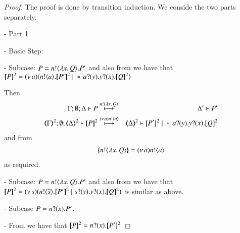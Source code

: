 \begin{proof}
	\noi The proof is done by transition induction.
	We conside the two parts separately.

	\noi - Part 1

	\noi - Basic Step:
 
	\noi - Subcase: $P= n ! \langle \lambda x.\,Q \rangle . P'$ 
	and also from 
	we have that\\
	$\pmap{P}{2} = \newsp{a}{\bout{n}{a} \pmap{P'}{2} \Par \repl{} \binp{a}{y} \binp{y}{x} \pmap{Q}{2}}$

	\noi Then
%
	\begin{eqnarray*}
		\Gamma; \es; \Delta \proves P &\hby{\bactout{n}{\abs{x}{Q}}} & \Delta' \proves P'\\
		\tmap{\Gamma}{2}; \es; \tmap{\Delta}{2} \proves \pmap{P}{2} &\hby{\news{a} \bactout{n}{a}}& \tmap{\Delta}{2} \proves \pmap{P'}{2} \Par \repl{} \binp{a}{y} \binp{y}{x} \pmap{Q}{2}
	\end{eqnarray*}
%
	\noi and from 
%
	\begin{eqnarray*}
		\{\!\!\{n ! \langle \lambda x.\,Q \rangle\}\!\!\} = (\nu\, a) n ! \langle a \rangle
	\end{eqnarray*}
%
	\noi as required.

	\noi - Subcase: $P= n ! \langle \lambda x.\,Q \rangle . P'$ 
	and also from 
	we have that\\
	$\pmap{P}{2} = \newsp{s}{\bout{n}{\dual{s}} \pmap{P'}{2} \Par \binp{s}{y} \binp{y}{x} \pmap{Q}{2}}$
	is similar as above. 

	\noi - Subcase $P = n ? (x) . P'$.

	\noi - From 
	we have that
	$\pmap{P}{2} = \binp{n}{x} \pmap{P'}{2}$


\end{proof}
